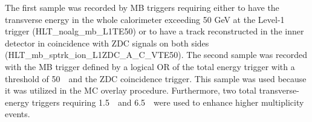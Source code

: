 The first sample was recorded by MB triggers requiring either to have the transverse energy in the whole calorimeter exceeding 50 GeV at the Level-1 trigger (HLT\_noalg\_mb\_L1TE50) or to have a track reconstructed in the inner detector in coincidence with ZDC signals on both sides (HLT\_mb\_sptrk\_ion\_L1ZDC\_A\_C\_VTE50).
The second sample was recorded with the MB trigger defined by a logical OR of the total energy trigger with a threshold of 50~\GeV\ and the ZDC coincidence trigger.
This sample was used because it was utilized in the MC overlay procedure.
Furthermore, two total transverse-energy triggers requiring 1.5~\TeV\ and 6.5~\TeV\ were used to enhance higher multiplicity events.

%
%



